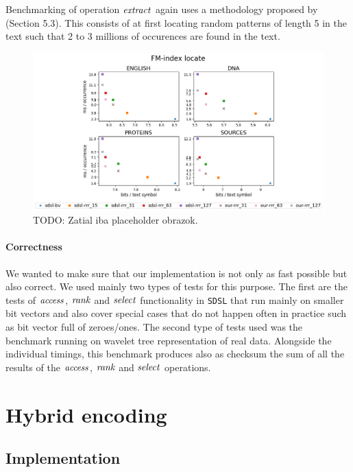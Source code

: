 Benchmarking of operation $\mathit{extract}$ again uses a methodology proposed by \cite{ferragina2009compressed} 
(Section 5.3). This consists of at first locating random patterns of length 5 in the text such
that 2 to 3 millions of occurences are found in the text.

\begin{figure}
	\centerline{
		\includegraphics[width=\textwidth, height=0.7\textheight]{images/vysledky_sdsl_locate}
	}
	\caption[TODO]{TODO: Zatial iba placeholder obrazok.
	}
	\label{obr:benchmark_sdsl_locate}
\end{figure}

\paragraph{Correctness}

We wanted to make sure that our implementation is not only as fast possible but also correct. We
used mainly two types of tests for this purpose. The first are the tests of $\mathit{access}$, $\mathit{rank}$
and $\mathit{select}$ functionality in \texttt{SDSL} that run mainly on smaller bit vectors and also cover
special cases that do not happen often in practice such as bit vector full of zeroes/ones. The
second type of tests used was the benchmark running on wavelet tree representation of real data.
Alongside the individual timings, this benchmark produces also as checksum the sum of all the
results of the $\mathit{access}$, $\mathit{rank}$ and $\mathit{select}$ operations.

\section{Hybrid encoding}

\subsection{Implementation}

